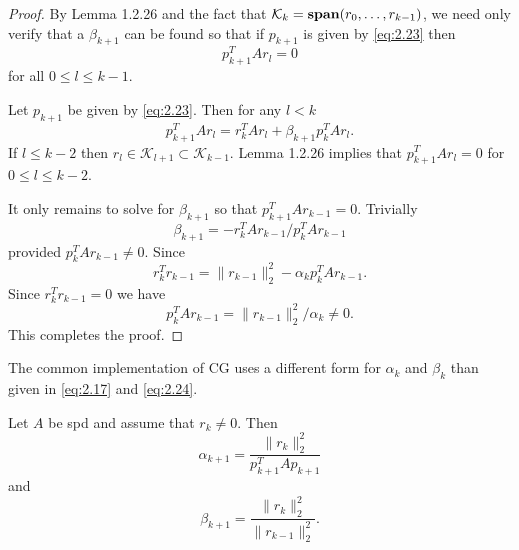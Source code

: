 \begin{proof}
  By Lemma 1.2.26 and the fact that
  $\mathcal{K}_k=\text{\textbf{span}}(r_0,\ldots,r_{k-1})$, we need
  only verify that a $\beta_{k+1}$ can be found so that if $p_{k+1}$
  is given by \eqref{eq:2.23} then $$p_{k+1}^TAr_l=0$$
  for all $0\leq l\leq k-1.$

  Let $p_{k+1}$ be given by \eqref{eq:2.23}. Then for any $l<k$
  $$p_{k+1}^TAr_l=r_k^TAr_l+\beta_{k+1}p_k^TAr_l.$$
  If $l\leq k-2$ then
  $r_l\in\mathcal{K}_{l+1}\subset\mathcal{K}_{k-1}.$ Lemma 1.2.26
  implies that $p_{k+1}^TAr_l=0$ for $0\leq l\leq k-2.$

  It only remains to solve for $\beta_{k+1}$ so that
  $p_{k+1}^TAr_{k-1}=0$. Trivially
  \begin{equation}
    \label{eq:2.24}
    \beta_{k+1}=-r_k^TAr_{k-1}/p_k^TAr_{k-1}
  \end{equation}
  provided $p_k^TAr_{k-1}\neq 0.$ Since
  $$r_k^Tr_{k-1}=\|r_{k-1}\|^2_2 - \alpha_kp_k^TAr_{k-1}.$$
  Since $r_k^Tr_{k-1}=0$ we have
  \begin{equation}
    \label{eq:2.25}
    p_k^TAr_{k-1}=\|r_{k-1}\|_2^2/\alpha_k\neq 0.
  \end{equation}
  This completes the proof.
\end{proof}

\begin{rmk}
  The common implementation of CG uses a different form for $\alpha_k$
  and $\beta_k$ than given in \eqref{eq:2.17} and \eqref{eq:2.24}.
\end{rmk}

\begin{lemma}
  Let $A$ be spd and assume that $r_k\neq 0$. Then
  \begin{equation}
    \label{eq:2.26}
    \alpha_{k+1}=\frac{\|r_k\|_2^2}{p_{k+1}^TAp_{k+1}}
  \end{equation}
  and
  \begin{equation}
    \label{eq:2.27}
    \beta_{k+1}=\frac{\|r_k\|_2^2}{\|r_{k-1}\|_2^2}.
  \end{equation}
\end{lemma}


